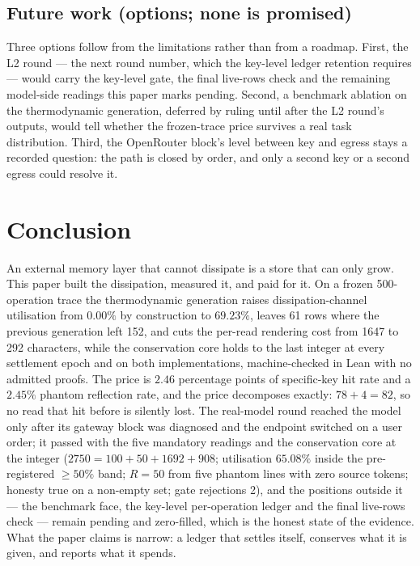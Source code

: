 \documentclass[11pt,a4paper]{article}
\begin{document}
\subsection{Future work (options; none is promised)}
Three options follow from the limitations rather than from a roadmap. First, the L2 round --- the next round number, which the key-level ledger retention requires --- would carry the key-level gate, the final live-rows check and the remaining model-side readings this paper marks pending. Second, a benchmark ablation on the thermodynamic generation, deferred by ruling until after the L2 round's outputs, would tell whether the frozen-trace price survives a real task distribution. Third, the OpenRouter block's level between key and egress stays a recorded question: the path is closed by order, and only a second key or a second egress could resolve it.

\section{Conclusion}
\label{sec:conclusion}
An external memory layer that cannot dissipate is a store that can only grow. This paper built the dissipation, measured it, and paid for it. On a frozen 500-operation trace the thermodynamic generation raises dissipation-channel utilisation from $0.00\%$ by construction to $69.23\%$, leaves 61 rows where the previous generation left 152, and cuts the per-read rendering cost from 1647 to 292 characters, while the conservation core holds to the last integer at every settlement epoch and on both implementations, machine-checked in Lean with no admitted proofs. The price is $2.46$ percentage points of specific-key hit rate and a $2.45\%$ phantom reflection rate, and the price decomposes exactly: $78 + 4 = 82$, so no read that hit before is silently lost. The real-model round reached the model only after its gateway block was diagnosed and the endpoint switched on a user order; it passed with the five mandatory readings and the conservation core at the integer ($2750 = 100 + 50 + 1692 + 908$; utilisation $65.08\%$ inside the pre-registered $\ge 50\%$ band; $R = 50$ from five phantom lines with zero source tokens; honesty true on a non-empty set; gate rejections 2), and the positions outside it --- the benchmark face, the key-level per-operation ledger and the final live-rows check --- remain pending and zero-filled, which is the honest state of the evidence. What the paper claims is narrow: a ledger that settles itself, conserves what it is given, and reports what it spends.
\end{document}
